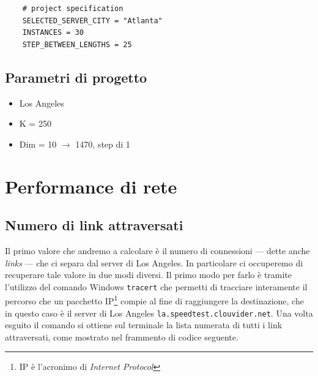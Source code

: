 \begin{lstlisting}
    # project specification
    SELECTED_SERVER_CITY = "Atlanta"
    INSTANCES = 30
    STEP_BETWEEN_LENGTHS = 25
\end{lstlisting}



\vspace{15px}\subsection{Parametri di progetto}

\begin{itemize}
    \item Los Angeles
    \item K = 250
    \item Dim = 10 $\to$ 1470, step di 1
\end{itemize}

\vspace{35px}\section{Performance di rete}


\vspace{15px}\subsection{Numero di link attraversati}

Il primo valore che andremo a calcolare è il numero di connessioni — dette anche \textsl{links} — che ci separa dal server di Los Angeles. In particolare ci occuperemo di recuperare tale valore in due modi diversi. Il primo modo per farlo è tramite l'utilizzo del comando Windows \texttt{tracert} che permetti di tracciare interamente il percorso che un pacchetto IP\footnote{IP è l'acronimo di \textsl{Internet Protocol}} compie al fine di raggiungere la destinazione, che in questo caso è il server di Los Angeles \texttt{la.speedtest.clouvider.net}. Una volta esguito il comando si ottiene sul terminale la lista numerata di tutti i link attraversati, come mostrato nel frammento di codice seguente. 

